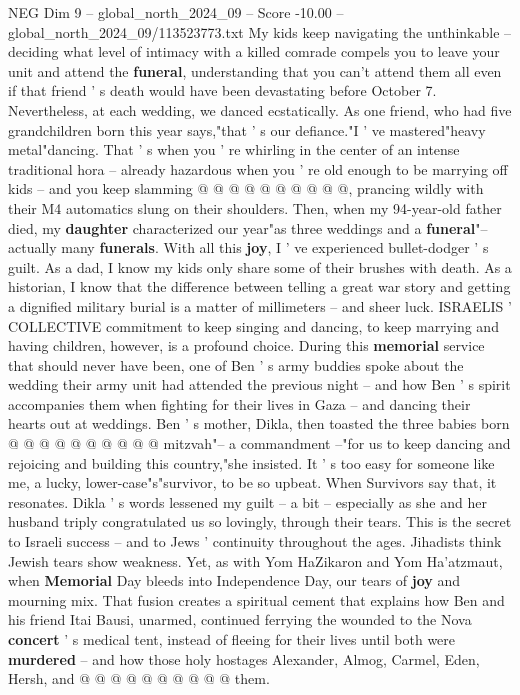\begin{textsample}{NEG Dim 9 – global\_north\_2024\_09 – Score -10.00 – global\_north\_2024\_09/113523773.txt}
My kids keep navigating the unthinkable -- deciding what level of intimacy with a killed comrade compels you to leave your unit and attend the \textbf{funeral}, understanding that you can't attend them all even if that friend ' s death would have been devastating before October 7.
Nevertheless, at each wedding, we danced ecstatically.
As one friend, who had five grandchildren born this year says,"that ' s our defiance."I ' ve mastered"heavy metal"dancing.
That ' s when you ' re whirling in the center of an intense traditional hora -- already hazardous when you ' re old enough to be marrying off kids -- and you keep slamming @ @ @ @ @ @ @ @ @ @, prancing wildly with their M4 automatics slung on their shoulders.
Then, when my 94-year-old father died, my \textbf{daughter} characterized our year"as three weddings and a \textbf{funeral}"-- actually many \textbf{funerals}.
With all this \textbf{joy}, I ' ve experienced bullet-dodger ' s guilt.
As a dad, I know my kids only share some of their brushes with death.
As a historian, I know that the difference between telling a great war story and getting a dignified military burial is a matter of millimeters -- and sheer luck.
ISRAELIS ' COLLECTIVE commitment to keep singing and dancing, to keep marrying and having children, however, is a profound choice.
During this \textbf{memorial} service that should never have been, one of Ben ' s army buddies spoke about the wedding their army unit had attended the previous night -- and how Ben ' s spirit accompanies them when fighting for their lives in Gaza -- and dancing their hearts out at weddings.
Ben ' s mother, Dikla, then toasted the three babies born @ @ @ @ @ @ @ @ @ @ mitzvah"-- a commandment --"for us to keep dancing and rejoicing and building this country,"she insisted.
It ' s too easy for someone like me, a lucky, lower-case"s"survivor, to be so upbeat.
When Survivors say that, it resonates.
Dikla ' s words lessened my guilt -- a bit -- especially as she and her husband triply congratulated us so lovingly, through their tears.
This is the secret to Israeli success -- and to Jews ' continuity throughout the ages.
Jihadists think Jewish tears show weakness.
Yet, as with Yom HaZikaron and Yom Ha'atzmaut, when \textbf{Memorial} Day bleeds into Independence Day, our tears of \textbf{joy} and mourning mix.
That fusion creates a spiritual cement that explains how Ben and his friend Itai Bausi, unarmed, continued ferrying the wounded to the Nova \textbf{concert} ' s medical tent, instead of fleeing for their lives until both were \textbf{murdered} -- and how those holy hostages Alexander, Almog, Carmel, Eden, Hersh, and @ @ @ @ @ @ @ @ @ @ them.

\end{textsample}
